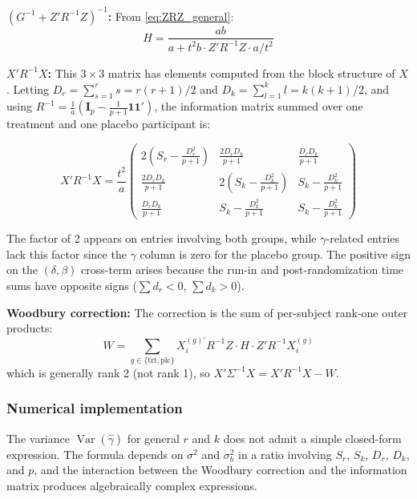 \documentclass[
]{article}
\begin{document}
\textbf{\((G^{-1} + Z'R^{-1}Z)^{-1}\):} From \eqref{eq:ZRZ_general}: \[
  H = \frac{ab}{a + t^2 b \cdot Z'R^{-1}Z \cdot a/t^2}
\]

\textbf{\(X'R^{-1}X\):} This \(3 \times 3\) matrix has elements computed
from the block structure of \(X\). Letting
\(D_r = \sum_{s=1}^r s = r(r+1)/2\) and
\(D_k = \sum_{l=1}^k l = k(k+1)/2\), and using
\(R^{-1} = \frac{1}{a}(\mathbf{I}_p -
\frac{1}{p+1}\mathbf{1}\mathbf{1}')\), the information matrix summed
over one treatment and one placebo participant is:

\begin{equation}
  X'R^{-1}X = \frac{t^2}{a}\begin{pmatrix}
    2\!\left(S_r - \frac{D_r^2}{p+1}\right) &
    \frac{2D_r D_k}{p+1} &
    \frac{D_r D_k}{p+1} \\[4pt]
    \frac{2D_r D_k}{p+1} &
    2\!\left(S_k - \frac{D_k^2}{p+1}\right) &
    S_k - \frac{D_k^2}{p+1} \\[4pt]
    \frac{D_r D_k}{p+1} &
    S_k - \frac{D_k^2}{p+1} &
    S_k - \frac{D_k^2}{p+1}
  \end{pmatrix}
  \label{eq:XRX_general}
\end{equation}

The factor of 2 appears on entries involving both groups, while
\(\gamma\)-related entries lack this factor since the \(\gamma\) column
is zero for the placebo group. The positive sign on the
\((\delta, \beta)\) cross-term arises because the run-in and
post-randomization time sums have opposite signs (\(\sum d_r < 0\),
\(\sum d_k > 0\)).

\textbf{Woodbury correction:} The correction is the sum of per-subject
rank-one outer products: \[
  W = \sum_{g \in \{\text{trt},\text{plc}\}}
    X_i^{(g)\prime} R^{-1} Z \cdot H \cdot
    Z' R^{-1} X_i^{(g)}
\] which is generally rank 2 (not rank 1), so
\(X'\Sigma^{-1}X = X'R^{-1}X - W\).

\subsubsection{Numerical implementation}\label{numerical-implementation}

The variance \(\mathop{\mathrm{Var}}(\hat{\gamma})\) for general \(r\)
and \(k\) does not admit a simple closed-form expression. The formula
depends on \(\sigma^2\) and \(\sigma_b^2\) in a ratio involving \(S_r\),
\(S_k\), \(D_r\), \(D_k\), and \(p\), and the interaction between the
Woodbury correction and the information matrix produces algebraically
complex expressions.
\end{document}
